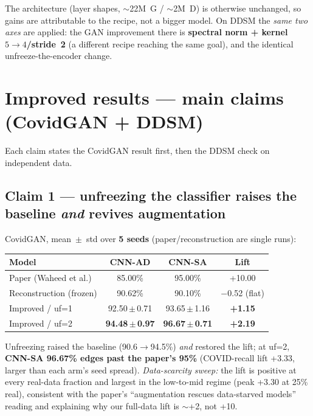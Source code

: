 \documentclass[11pt]{article}
\begin{document}
\noindent The architecture (layer shapes, $\sim$22M~G / $\sim$2M~D) is otherwise
unchanged, so gains are attributable to the recipe, not a bigger model. On DDSM the
\emph{same two axes} are applied: the GAN improvement there is \textbf{spectral norm +
kernel~$5{\to}4$/stride~2} (a different recipe reaching the same goal), and the
identical unfreeze-the-encoder change.

\section{Improved results --- main claims (CovidGAN + DDSM)}
\label{sec:results}
Each claim states the CovidGAN result first, then the DDSM check on independent data.

\subsection{Claim 1 --- unfreezing the classifier raises the baseline \emph{and} revives augmentation}
CovidGAN, mean~$\pm$~std over \textbf{5 seeds} (paper/reconstruction are single runs):

\begin{table}[htbp]\centering\small
\begin{tabular}{@{}lccc@{}}\toprule
\textbf{Model} & \textbf{CNN-AD} & \textbf{CNN-SA} & \textbf{Lift} \\ \midrule
Paper (Waheed et al.) & 85.00\% & 95.00\% & +10.00 \\
Reconstruction (frozen) & 90.62\% & 90.10\% & $-$0.52 (flat) \\
Improved / uf=1 & 92.50\,$\pm$\,0.71 & 93.65\,$\pm$\,1.16 & \textbf{+1.15} \\
Improved / uf=2 & \textbf{94.48\,$\pm$\,0.97} & \textbf{96.67\,$\pm$\,0.71} & \textbf{+2.19} \\
\bottomrule\end{tabular}\end{table}

\noindent Unfreezing raised the baseline (90.6$\to$94.5\%) \emph{and} restored the
lift; at uf=2, \textbf{CNN-SA 96.67\% edges past the paper's 95\%} (COVID-recall lift
+3.33, larger than each arm's seed spread). \emph{Data-scarcity sweep:} the lift is
positive at every real-data fraction and largest in the low-to-mid regime (peak +3.30
at 25\% real), consistent with the paper's ``augmentation rescues data-starved
models'' reading and explaining why our full-data lift is $\sim$+2, not +10.
\end{document}
